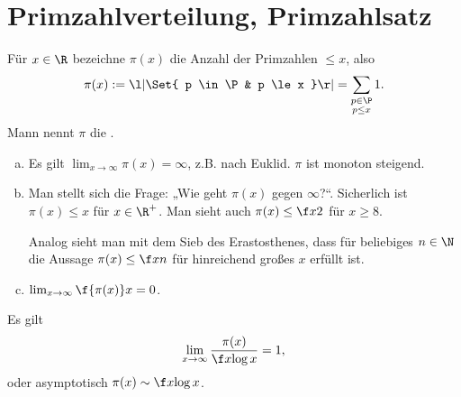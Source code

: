 \chapter{Primzahlverteilung, Primzahlsatz} \label{chap:7}


\begin{df} \label{7.1}
	Für $x \in \R$ bezeichne $\pi(x)$ die Anzahl der Primzahlen $\le x$, also
	\[
		\pi(x)
		:= \l| \Set{ p \in \P & p \le x } \r|
		= \sum_{\substack{p \in \P \\ p \le x}} 1.
	\]
	Mann nennt $\pi$ die .
\end{df}

\begin{nt*}
	\begin{enumerate}[a)]
		\item
			Es gilt $\lim_{x \to \infty} \pi(x) = \infty$, z.B. nach Euklid.
			$\pi$ ist monoton steigend.
		\item
			Man stellt sich die Frage: „Wie geht $\pi(x)$ gegen $\infty$?“.
			Sicherlich ist $\pi(x) \le x$ für $x \in \R^+$.
			Man sieht auch $\pi(x) \le \f x2$ für $x \ge 8$.

			Analog sieht man mit dem Sieb des Erastosthenes, dass für beliebiges $n \in \N$ die Aussage $\pi(x) \le \f xn$ für hinreichend großes $x$ erfüllt ist.
		\item
			$\lim_{x\to\infty} \f {\pi(x)}x = 0$.
	\end{enumerate}
\end{nt*}

\setcounter{thm}{2}
\begin{st} \label{7.3}
	Es gilt
	\[
		\lim_{x\to\infty} \dfrac {\pi(x)}{\f x{\log x}} = 1,
	\]
	oder asymptotisch $\pi(x) \sim \f x{\log x}$.
\end{st}

